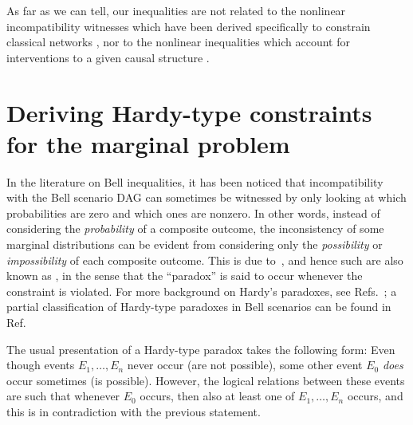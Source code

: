 
As far as we can tell, our inequalities are not related to the nonlinear incompatibility witnesses which have been derived specifically to constrain classical networks \cite{TavakoliStarNetworks,RossetNetworks,TavakoliNoncyclicNetworks}, nor to the nonlinear inequalities which account for interventions to a given causal structure \cite{kang2007polynomialconstraints,steeg2011relaxation}.


\section{Deriving Hardy-type constraints for the marginal problem}\label{sec:TSEM}

In the literature on Bell inequalities, it has been noticed that incompatibility with the Bell scenario DAG can sometimes be witnessed by only looking at which probabilities are zero and which ones are nonzero. In other words, instead of considering the \emph{probability} of a composite outcome, the inconsistency of some marginal distributions can be evident from considering only the \emph{possibility} or \emph{impossibility} of each composite outcome. This is due to~\citet{L.Hardy:PRL:1665}, and hence such  are also known as , in the sense that the ``paradox'' is said to occur whenever the constraint is violated. For more background on Hardy's paradoxes, see Refs.~\cite{Garuccio95,CabelloHardyInequality,Braun08,Mancinska14,LSW}; a partial classification of Hardy-type paradoxes in Bell scenarios can be found in Ref.~\cite{Mansfield2012}

The usual presentation of a Hardy-type paradox takes the following form: Even though events $E_1, \ldots, E_n$ never occur (are not possible), some other event $E_0$ \emph{does} occur sometimes (is possible). However, the logical relations between these events are such that whenever $E_0$ occurs, then also at least one of $E_1,\ldots,E_n$ occurs, and this is in contradiction with the previous statement.

